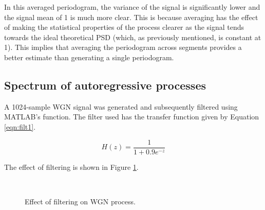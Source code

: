 \noindent
In this averaged periodogram, the variance of the signal is significantly lower and the signal mean of 1 is much more clear. This is because averaging has the effect of making the statistical properties of the process clearer as the signal tends towards the ideal theoretical PSD (which, as previously mentioned, is constant at 1). This implies that averaging the periodogram across segments provides a better estimate than generating a single periodogram.

\subsection{Spectrum of autoregressive processes}

A 1024-sample WGN signal was generated and subsequently filtered using MATLAB's  function. The filter used has the transfer function given by Equation \ref{eqn:filt1}.

\begin{equation}
    H(z) = \frac{1}{1+0.9e^{-z}}
    \label{eqn:filt1}
\end{equation}

\noindent
The effect of filtering is shown in Figure \ref{fig:filtering}.

\begin{figure}[H]
    \centering
    \\
    \caption{Effect of filtering on WGN process.}
    \label{fig:filtering}
\end{figure}

